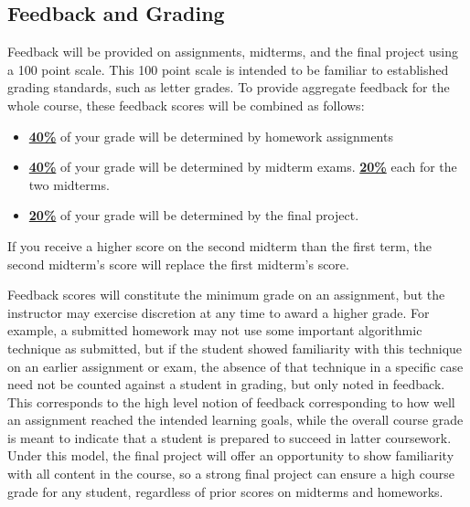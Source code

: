 \documentclass[11pt]{article}
\begin{document}
\subsection*{Feedback and Grading}
Feedback will be provided on assignments, midterms, and the final project using a 100 point scale.
This 100 point scale is intended to be familiar to established grading standards, such as letter grades. To provide aggregate feedback for the whole course, these feedback scores will be combined as follows:
\begin{itemize}
	\item \underline{\textbf{40\%}} of your grade will be determined by homework assignments
	\item \underline{\textbf{40\%}} of your grade will be determined by midterm exams.
	\subitem \underline{\textbf{20\%}} each for the two midterms.
	\item \underline{\textbf{20\%}} of your grade will be determined by the final project.
\end{itemize}

If you receive a higher score on the second midterm than the first term, the second midterm's score will replace the first midterm's score.

\noindent Feedback scores will constitute the minimum grade on an assignment, but the instructor
may exercise discretion at any time to award a higher grade. For example, a submitted homework
may not use some important algorithmic technique as submitted, but if the student showed familiarity
with this technique on an earlier assignment or exam, the absence of that technique in a specific
case need not be counted against a student in grading, but only noted in feedback. This corresponds to the high level notion of feedback corresponding to how well an assignment reached the intended learning goals, while the overall course grade is meant to indicate that a student is prepared to succeed in latter coursework. Under this model, the final project will offer an opportunity to show familiarity with all content in the course, so a strong final project can ensure a high course grade
for any student, regardless of prior scores on midterms and homeworks.


\end{document}
